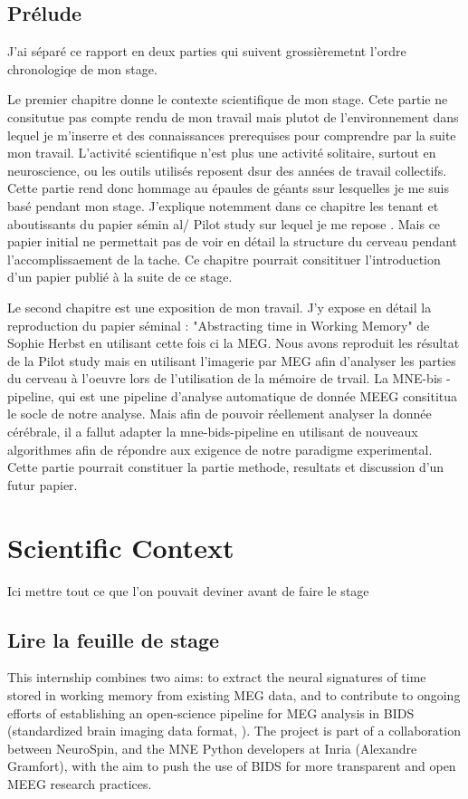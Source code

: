 \section{Prélude}

J'ai séparé ce rapport en deux parties qui suivent grossièremetnt l'ordre chronologiqe de mon stage.

Le premier chapitre donne le contexte scientifique de mon stage. Cete partie ne consitutue pas compte rendu de mon travail mais plutot de l'environnement dans lequel je m'inserre et des connaissances prerequises pour comprendre par la suite mon travail. L'activité scientifique n'est plus une activité solitaire, surtout en neuroscience, ou les outils utilisés reposent dsur des années de travail collectifs. Cette partie rend donc hommage au épaules de géants ssur lesquelles je me suis basé pendant mon stage. J'explique notemment dans ce chapitre les tenant et aboutissants du papier sémin al/ Pilot study sur lequel je me repose \cite{herbst2021abstracting}. Mais ce papier initial ne permettait pas de voir en détail la structure du cerveau pendant l'accomplissaement de la tache. Ce chapitre pourrait consitituer l'introduction d'un papier publié à la suite de ce stage.

Le second chapitre est une exposition de mon travail. J'y expose en détail la reproduction du papier séminal : "Abstracting time in Working Memory" de Sophie Herbst en utilisant cette fois ci la MEG. Nous avons reproduit les résultat de la Pilot study mais en utilisant l'imagerie par MEG afin d'analyser les parties du cerveau à l'oeuvre lors de l'utilisation de la mémoire de trvail. La MNE-bis -pipeline, qui est une pipeline d'analyse automatique de donnée MEEG consititua le socle de notre analyse. Mais afin de pouvoir réellement analyser la donnée cérébrale, il a fallut adapter la mne-bids-pipeline en utilisant de nouveaux algorithmes afin de répondre aux exigence de notre paradigme experimental. Cette partie pourrait constituer la partie methode, resultats et discussion d'un futur papier.


\chapter{Scientific Context}
Ici mettre tout ce que l'on pouvait deviner avant de faire le stage

\section{Lire la feuille de stage}
This internship combines two aims: to extract the neural signatures of time stored
in working memory from existing MEG data, and to contribute to ongoing efforts of
establishing an open-science pipeline for MEG analysis in BIDS (standardized brain imaging
data format, \cite{gorgolewski2016brain}). The project is part of a collaboration between NeuroSpin, and the MNE
Python developers at Inria (Alexandre Gramfort), with the aim to push the use of BIDS for
more transparent and open MEEG research practices.

